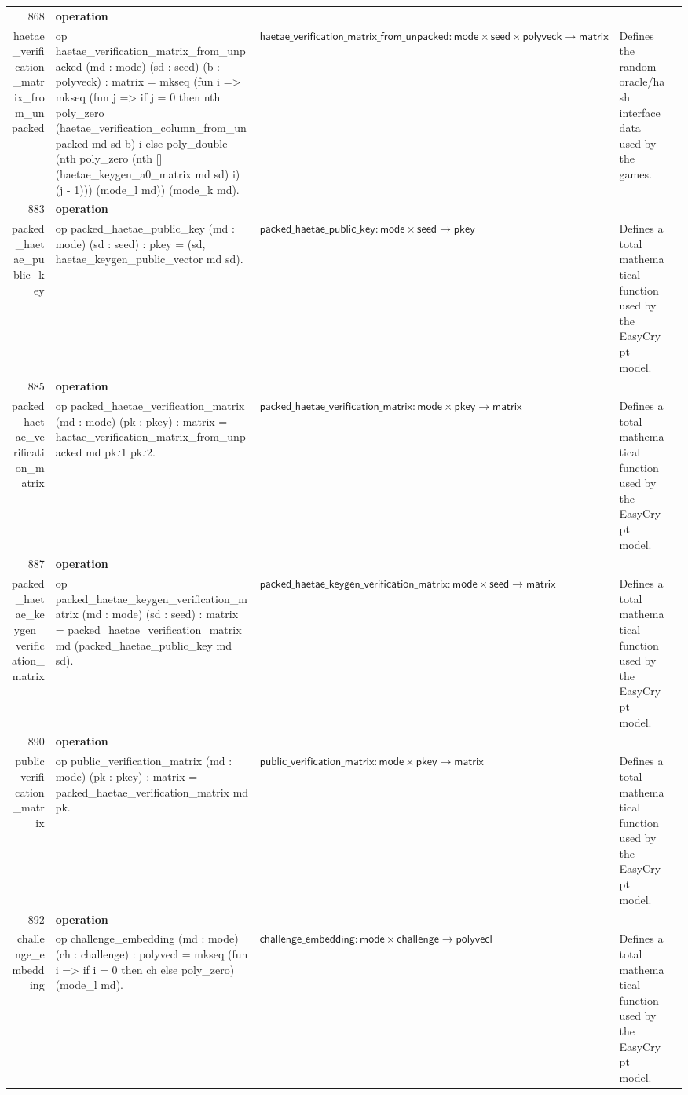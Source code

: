 \documentclass[10pt]{article}
\newcommand{\ec}[1]{\begingroup\ttfamily\scriptsize #1\endgroup}
\begin{document}
\begin{longtable}{r L{0.17\textwidth} L{0.26\textwidth} L{0.27\textwidth} L{0.20\textwidth}}
868 & \textbf{operation}\\\ec{haetae\_verification\_matrix\_from\_unpacked} & \ec{op haetae\_verification\_matrix\_from\_unpacked (md : mode) (sd : seed) (b : polyveck) : matrix = mkseq (fun i => mkseq (fun j => if j = 0 then nth poly\_zero (haetae\_verification\_column\_from\_unpacked md sd b) i else poly\_double (nth poly\_zero (nth [] (haetae\_keygen\_a0\_matrix md sd) i) (j - 1))) (mode\_l md)) (mode\_k md).} & \(\mathsf{haetae\_verification\_matrix\_from\_unpacked} : \mathsf{mode} \times \mathsf{seed} \times \mathsf{polyveck} \to \mathsf{matrix}\) & Defines the random-oracle/hash interface data used by the games. \\
883 & \textbf{operation}\\\ec{packed\_haetae\_public\_key} & \ec{op packed\_haetae\_public\_key (md : mode) (sd : seed) : pkey = (sd, haetae\_keygen\_public\_vector md sd).} & \(\mathsf{packed\_haetae\_public\_key} : \mathsf{mode} \times \mathsf{seed} \to \mathsf{pkey}\) & Defines a total mathematical function used by the EasyCrypt model. \\
885 & \textbf{operation}\\\ec{packed\_haetae\_verification\_matrix} & \ec{op packed\_haetae\_verification\_matrix (md : mode) (pk : pkey) : matrix = haetae\_verification\_matrix\_from\_unpacked md pk.`1 pk.`2.} & \(\mathsf{packed\_haetae\_verification\_matrix} : \mathsf{mode} \times \mathsf{pkey} \to \mathsf{matrix}\) & Defines a total mathematical function used by the EasyCrypt model. \\
887 & \textbf{operation}\\\ec{packed\_haetae\_keygen\_verification\_matrix} & \ec{op packed\_haetae\_keygen\_verification\_matrix (md : mode) (sd : seed) : matrix = packed\_haetae\_verification\_matrix md (packed\_haetae\_public\_key md sd).} & \(\mathsf{packed\_haetae\_keygen\_verification\_matrix} : \mathsf{mode} \times \mathsf{seed} \to \mathsf{matrix}\) & Defines a total mathematical function used by the EasyCrypt model. \\
890 & \textbf{operation}\\\ec{public\_verification\_matrix} & \ec{op public\_verification\_matrix (md : mode) (pk : pkey) : matrix = packed\_haetae\_verification\_matrix md pk.} & \(\mathsf{public\_verification\_matrix} : \mathsf{mode} \times \mathsf{pkey} \to \mathsf{matrix}\) & Defines a total mathematical function used by the EasyCrypt model. \\
892 & \textbf{operation}\\\ec{challenge\_embedding} & \ec{op challenge\_embedding (md : mode) (ch : challenge) : polyvecl = mkseq (fun i => if i = 0 then ch else poly\_zero) (mode\_l md).} & \(\mathsf{challenge\_embedding} : \mathsf{mode} \times \mathsf{challenge} \to \mathsf{polyvecl}\) & Defines a total mathematical function used by the EasyCrypt model. \\

\end{longtable}
\end{document}
